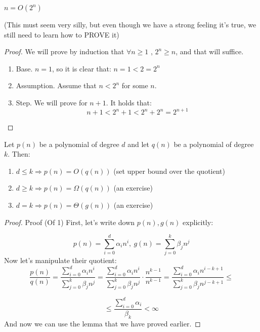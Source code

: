 \begin{claim} \(n = O(2^n)\)
\end{claim}
(This must seem very silly, but even though we have a strong feeling it’s true, we still need to learn how to PROVE it)
\begin{proof} We will prove by induction that \( \forall n \ge 1 \) , \(2^n \ge n\), and that will suffice.
  \begin{enumerate}
    \item      Base. \(n = 1\), so it is clear that: \(n = 1 < 2 = 2^n\)
    \item      Assumption. Assume that \(n < 2^n\) for some \(n\).
    \item      Step. We will prove for \(n + 1\). It holds that:
      \begin{equation*}
	n + 1 < 2^{n} + 1 < 2^n + 2^n = 2^{n+1}
      \end{equation*}
  \end{enumerate}
\end{proof}
\begin{claim}
Let $p(n)$ be a polynomial of degree $d$ and let $q(n)$ be a polynomial
of degree $k$. Then:
\begin{enumerate}
\item $d\leq k\Rightarrow p(n)=O(q(n))$ (set upper bound over the quotient)
\item $d\geq k\Rightarrow p(n)=\Omega(q(n))$ (an exercise)
\item $d=k\Rightarrow p(n)=\Theta(g(n))$ (an exercise)
\end{enumerate}
\end{claim}
\begin{proof}Proof (Of 1) First, let's write down $p(n), g(n)$ explicitly:


\[
p(n)=\sum_{i=0}^{d}\alpha_{i}n^{i},\ g(n)=\sum_{j=0}^{k}\beta_{j}n^{j}
\]
Now let's manipulate their quotient:
\[
\frac{p(n)}{q(n)}=\frac{\sum_{i=0}^{d}\alpha_{i}n^{i}}{\sum_{j=0}^{k}\beta_{j}n^{j}}=\frac{\sum_{i=0}^{d}\alpha_{i}n^{i}}{\sum_{j=0}^{k}\beta_{j}n^{j}}\cdot\frac{n^{k-1}}{n^{k-1}}=\frac{\sum_{i=0}^{d}\alpha_{i}n^{i-k+1}}{\sum_{j=0}^{k}\beta_{j}n^{j-k+1}}\leq
\]

\[
\leq\frac{\sum_{i=0}^{d}\alpha_{i}}{\beta_{k}} < \infty
\]
And now we can use the lemma that we have proved earlier. 
\end{proof}

